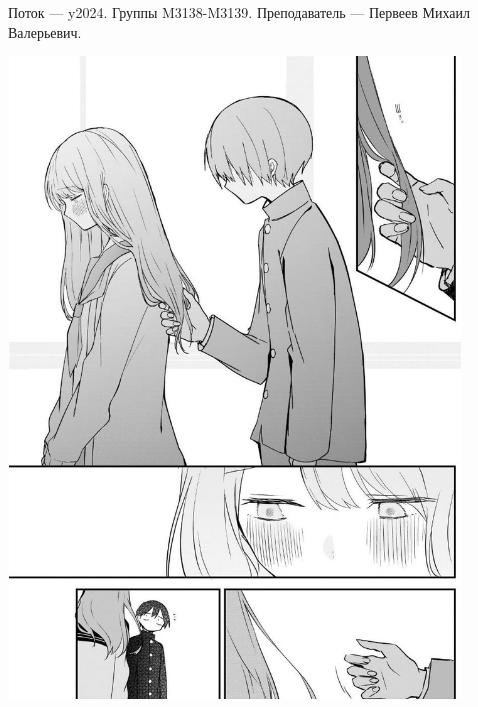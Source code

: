 Поток — y2024.\newline
Группы M3138-M3139.\newline
Преподаватель --- Первеев Михаил Валерьевич.\par

\begin{center}
   \includegraphics[width=12cm, height=17cm]{MyLoveImages/myLoveLove.jpg}
\end{center}